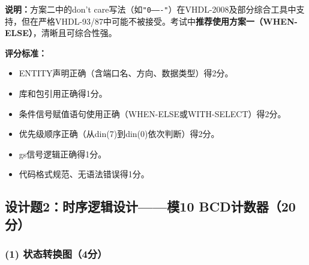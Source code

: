 \noindent\textbf{说明：}方案二中的don't care写法（如\texttt{"0-------"}）在VHDL-2008及部分综合工具中支持，但在严格VHDL-93/87中可能不被接受。考试中\textbf{推荐使用方案一（WHEN-ELSE）}，清晰且可综合性强。

\medskip
\noindent\textbf{评分标准：}
\begin{itemize}
  \item ENTITY声明正确（含端口名、方向、数据类型）得2分。
  \item 库和包引用正确得1分。
  \item 条件信号赋值语句使用正确（WHEN-ELSE或WITH-SELECT）得2分。
  \item 优先级顺序正确（从din(7)到din(0)依次判断）得2分。
  \item gs信号逻辑正确得1分。
  \item 代码格式规范、无语法错误得1分。
\end{itemize}

\newpage
\subsection{设计题2：时序逻辑设计——模10 BCD计数器（20分）}

\subsubsection*{(1) 状态转换图（4分）}

